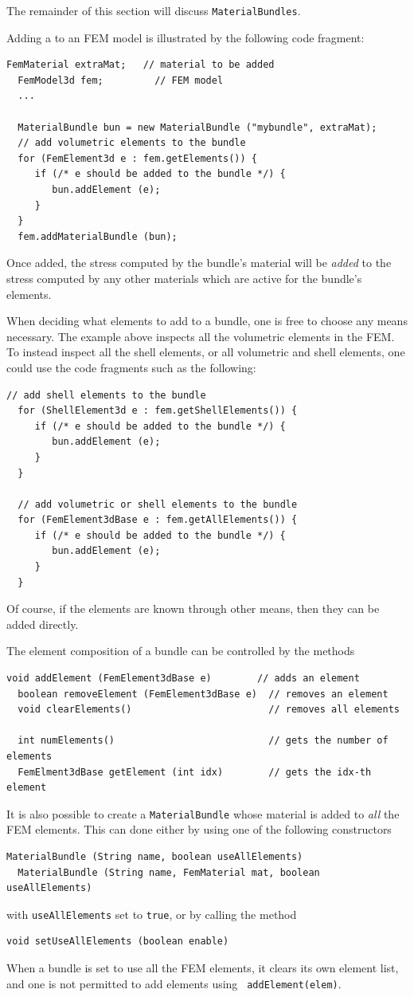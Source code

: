 The remainder of this section will discuss {\tt MaterialBundles}.

Adding a  to
an FEM model is illustrated by the following code fragment:
%
\begin{lstlisting}[]
  FemMaterial extraMat;   // material to be added
  FemModel3d fem;         // FEM model
  ...
  
  MaterialBundle bun = new MaterialBundle ("mybundle", extraMat);
  // add volumetric elements to the bundle
  for (FemElement3d e : fem.getElements()) {
     if (/* e should be added to the bundle */) {
        bun.addElement (e);
     }
  }
  fem.addMaterialBundle (bun);  
\end{lstlisting}
%
Once added, the stress computed by the bundle's material will be {\it
added} to the stress computed by any other materials which are active
for the bundle's elements.

When deciding what elements to add to a bundle, one is free to choose
any means necessary. The example above inspects all the volumetric
elements in the FEM. To instead inspect all the shell elements, or all
volumetric and shell elements, one could use the code
fragments such as the following:
%
\begin{lstlisting}[]
  // add shell elements to the bundle
  for (ShellElement3d e : fem.getShellElements()) {
     if (/* e should be added to the bundle */) {
        bun.addElement (e);
     }
  }

  // add volumetric or shell elements to the bundle
  for (FemElement3dBase e : fem.getAllElements()) {
     if (/* e should be added to the bundle */) {
        bun.addElement (e);
     }
  }
\end{lstlisting}
%
Of course, if the elements are known through other means, then they
can be added directly.

The element composition of a bundle can be controlled by the methods
%
\begin{lstlisting}[]
  void addElement (FemElement3dBase e)        // adds an element
  boolean removeElement (FemElement3dBase e)  // removes an element
  void clearElements()                        // removes all elements

  int numElements()                           // gets the number of elements
  FemElment3dBase getElement (int idx)        // gets the idx-th element 
\end{lstlisting}
%

It is also possible to create a {\tt MaterialBundle} whose material is
added to {\it all} the FEM elements. This can done either by using one
of the following constructors
%
\begin{lstlisting}[]
  MaterialBundle (String name, boolean useAllElements)
  MaterialBundle (String name, FemMaterial mat, boolean useAllElements)
\end{lstlisting}
%
with {\tt useAllElements} set to {\tt true}, or
by calling the method
%
\begin{lstlisting}[]
  void setUseAllElements (boolean enable)
\end{lstlisting}
%
When a bundle is set to use all the FEM elements, it clears its own
element list, and one is not permitted to add elements using {\tt
addElement(elem)}.

